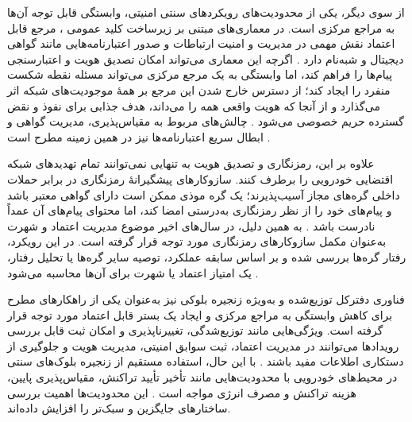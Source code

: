 از سوی دیگر، یکی از محدودیت‌های رویکردهای سنتی امنیتی، وابستگی قابل توجه آن‌ها به مراجع مرکزی است. در معماری‌های مبتنی بر زیرساخت کلید عمومی ، مرجع قابل اعتماد  نقش مهمی در مدیریت و امنیت ارتباطات و صدور اعتبارنامه‌هایی مانند گواهی دیجیتال و شبه‌نام دارد \cite{rahmawatiagustinaSystematicLiteratureReview2025}. اگرچه این معماری می‌تواند امکان تصدیق هویت و اعتبارسنجی پیام‌ها را فراهم کند، اما وابستگی به یک مرجع مرکزی می‌تواند مسئله نقطه شکست منفرد  را ایجاد کند؛ از دسترس خارج شدن این مرجع بر همهٔ موجودیت‌های شبکه اثر می‌گذارد و از آنجا که هویت واقعی همه را می‌داند، هدف جذابی برای نفوذ و نقض گسترده حریم خصوصی می‌شود \cite{rahmawatiagustinaSystematicLiteratureReview2025}. چالش‌های مربوط به مقیاس‌پذیری، مدیریت گواهی و ابطال سریع اعتبارنامه‌ها نیز در همین زمینه مطرح است \cite{farsimadanReviewSecurityChallenges2025,hozouriOverviewVANETVehicular2023}.

علاوه بر این، رمزنگاری و تصدیق هویت به تنهایی نمی‌توانند تمام تهدیدهای شبکه اقتضایی خودرویی را برطرف کنند. سازوکارهای پیشگیرانهٔ رمزنگاری در برابر حملات داخلی گره‌های مجاز آسیب‌پذیرند؛ یک گره موذی ممکن است دارای گواهی معتبر باشد و پیام‌های خود را از نظر رمزنگاری به‌درستی امضا کند، اما محتوای پیام‌های آن عمداً نادرست باشد \cite{farsimadanReviewSecurityChallenges2025}. به همین دلیل، در سال‌های اخیر موضوع مدیریت اعتماد و شهرت به‌عنوان مکمل سازوکارهای رمزنگاری مورد توجه قرار گرفته است. در این رویکرد، رفتار گره‌ها بررسی شده و بر اساس سابقه عملکرد، توصیه سایر گره‌ها یا تحلیل رفتار، یک امتیاز اعتماد یا شهرت برای آن‌ها محاسبه می‌شود \cite{razaBlockchainBasedReputationTrust2024,ghovanlooyghajarSBTMSScalableBlockchain2021}.

فناوری دفترکل توزیع‌شده  و به‌ویژه زنجیره بلوکی  نیز به‌عنوان یکی از راهکارهای مطرح برای کاهش وابستگی به مراجع مرکزی و ایجاد یک بستر قابل اعتماد مورد توجه قرار گرفته است. ویژگی‌هایی مانند توزیع‌شدگی، تغییرناپذیری و امکان ثبت قابل بررسی رویدادها می‌توانند در مدیریت اعتماد، ثبت سوابق امنیتی، مدیریت هویت و جلوگیری از دستکاری اطلاعات مفید باشند \cite{razaBlockchainBasedReputationTrust2024,fengBPASBlockchainAssistedPrivacyPreserving2020}. با این حال، استفاده مستقیم از زنجیره بلوک‌های سنتی در محیط‌های خودرویی با محدودیت‌هایی مانند تأخیر تأیید تراکنش، مقیاس‌پذیری پایین، هزینه تراکنش و مصرف انرژی مواجه است \cite{razaBlockchainBasedReputationTrust2024,ghovanlooyghajarSBTMSScalableBlockchain2021,IOTATANGLE20}. این محدودیت‌ها اهمیت بررسی ساختارهای جایگزین و سبک‌تر را افزایش داده‌اند.

